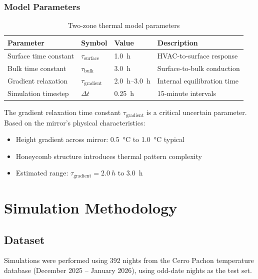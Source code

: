 \documentclass[11pt,a4paper]{article}
\begin{document}
\subsubsection{Model Parameters}

\begin{table}[H]
\centering
\caption{Two-zone thermal model parameters}
\label{tab:model_params}
\begin{tabular}{@{}llll@{}}
\toprule
Parameter & Symbol & Value & Description \\
\midrule
Surface time constant & $\tau_{\text{surface}}$ & \SI{1.0}{h} & HVAC-to-surface response \\
Bulk time constant & $\tau_{\text{bulk}}$ & \SI{3.0}{h} & Surface-to-bulk conduction \\
Gradient relaxation & $\tau_{\text{gradient}}$ & \SI{2.0}{h}--\SI{3.0}{h} & Internal equilibration time \\
Simulation timestep & $\Delta t$ & \SI{0.25}{h} & 15-minute intervals \\
\bottomrule
\end{tabular}
\end{table}

The gradient relaxation time constant $\tau_{\text{gradient}}$ is a critical uncertain parameter. Based on the mirror's physical characteristics:
\begin{itemize}
    \item Height gradient across mirror: \SI{0.5}{\celsius} to \SI{1.0}{\celsius} typical
    \item Honeycomb structure introduces thermal pattern complexity
    \item Estimated range: $\tau_{\text{gradient}} = \SI{2.0}{h}$ to \SI{3.0}{h}
\end{itemize}

\section{Simulation Methodology}

\subsection{Dataset}

Simulations were performed using 392 nights from the Cerro Pachon temperature database (December 2025 -- January 2026), using odd-date nights as the test set.
\end{document}
